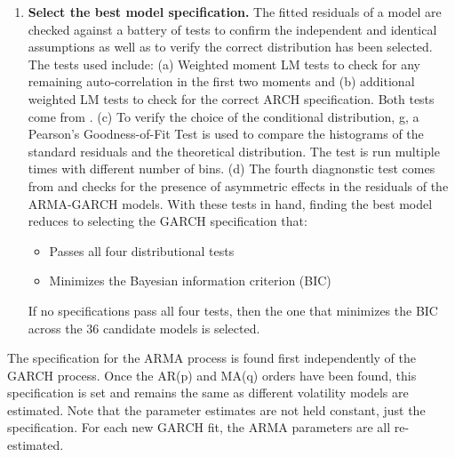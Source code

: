 \begin{enumerate}
    \item \textbf{Select the best model specification.} The fitted residuals of a model are checked against a battery of tests to confirm the independent and identical assumptions as well as to verify the correct distribution has been selected. The tests used include: (a) Weighted moment LM tests to check for any remaining auto-correlation in the first two moments and (b) additional weighted LM tests to check for the correct ARCH specification. Both tests come from \cite{Fisher_Gallagher_2012}. (c) To verify the choice of the conditional distribution, g, a Pearson’s Goodness-of-Fit Test is used to compare the histograms of the standard residuals and the theoretical distribution. The test is run multiple times with different number of bins. (d) The fourth diagnonstic test comes from \cite{Engle_Ng_1993} and checks for the presence of asymmetric effects in the residuals of the ARMA-GARCH models. With these tests in hand, finding the best model reduces to selecting the GARCH specification that:
    
    \begin{itemize}
        \item Passes all four distributional tests
        \item Minimizes the Bayesian information criterion (BIC)
    \end{itemize}

    If no specifications pass all four tests, then the one that minimizes the BIC across the 36 candidate models is selected.

\end{enumerate}

The specification for the ARMA process is found first independently of the GARCH process. Once the AR(p) and MA(q) orders have been found, this specification is set and remains the same as different volatility models are estimated. Note that the parameter estimates are not held constant, just the specification. For each new GARCH fit, the ARMA parameters are all re-estimated.
